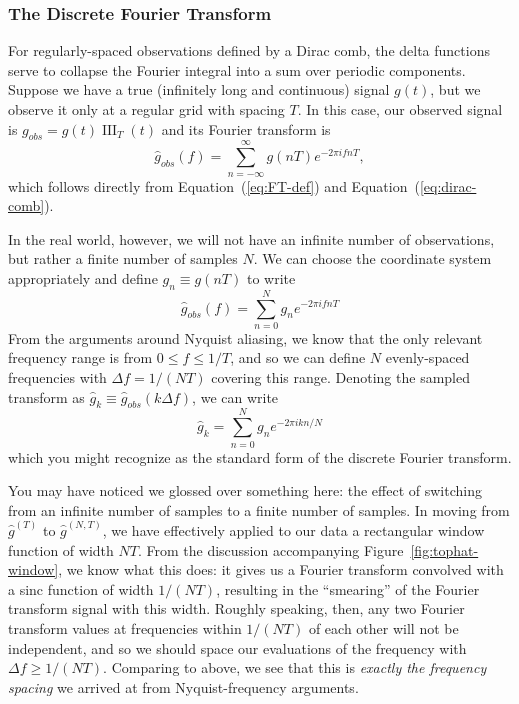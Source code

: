 \documentclass[preprint]{aastex}
\DeclareMathOperator{\III}{III}
\newcommand{\fig}[1]{Figure~\ref{fig:#1}}
\newcommand{\Eq}[1]{Equation~(\ref{eq:#1})}
\newcommand{\eq}[1]{\Eq{#1}}
\newcommand{\eqlabel}[1]{\label{eq:#1}}
\begin{document}
\subsubsection{The Discrete Fourier Transform}
For regularly-spaced observations defined by a Dirac comb, the delta functions
serve to collapse the Fourier integral into a sum over periodic components.
Suppose we have a true (infinitely long and continuous) signal $g(t)$, but
we observe it only at a regular grid with spacing $T$. In this case, our
observed signal is $g_{obs} = g(t) \III_T(t)$ and its Fourier transform is
\begin{equation}
  \hat{g}_{obs}(f) = \sum_{n=-\infty}^\infty g(nT) e^{-2\pi i f n T},
\end{equation}
which follows directly from \eq{FT-def} and \eq{dirac-comb}.

In the real world, however, we will not have an infinite number of observations,
but rather a finite number of samples $N$.
We can choose the coordinate system appropriately and define
$g_n \equiv g(nT)$ to write
\begin{equation}
  \hat{g}_{obs}(f) = \sum_{n=0}^N g_n e^{-2\pi i f n T}
  \eqlabel{DFT-f}
\end{equation}
From the arguments around Nyquist aliasing, we know that the only relevant
frequency range is from $0 \le f \le 1/T$, and so we can define $N$
evenly-spaced frequencies with $\Delta f = 1 / (NT)$ covering this range.
Denoting the sampled transform as
$\hat{g}_k \equiv \hat{g}_{obs}(k\Delta f)$, we can write
\begin{equation}
  \hat{g}_k = \sum_{n=0}^N g_n e^{-2\pi i k n / N}
  \eqlabel{DFT}
\end{equation}
which you might recognize as the standard form of the discrete Fourier
transform.

You may have noticed we glossed over something here: the effect of switching
from an infinite number of samples to a finite number of samples.
In moving from $\hat{g}^{(T)}$ to $\hat{g}^{(N,T)}$, we have effectively applied
to our data a rectangular window function of width $NT$.
From the discussion accompanying \fig{tophat-window}, we know what this does:
it gives us a Fourier transform convolved with a sinc function of width
$1 / (NT)$, resulting in the ``smearing'' of the Fourier transform signal
with this width.
Roughly speaking, then, any two Fourier transform values at frequencies within
$1/(NT)$ of each other will not be independent, and so we should space our
evaluations of the frequency with $\Delta f \ge 1/(NT)$.
Comparing to above, we see that this is {\it exactly the frequency spacing}
we arrived at from Nyquist-frequency arguments.
\end{document}
